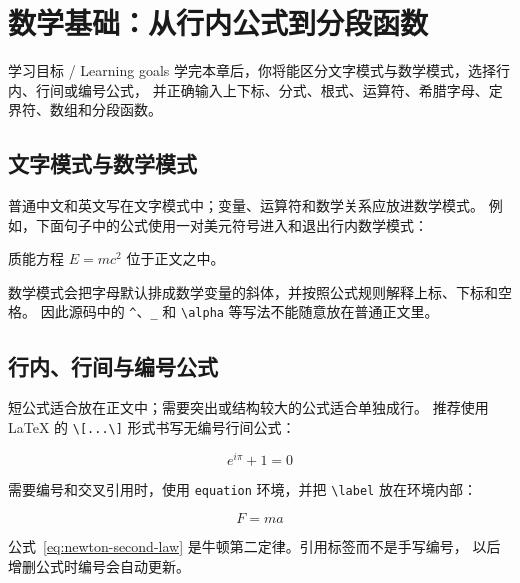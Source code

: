 %
\section{数学基础：从行内公式到分段函数}

\begin{learningbox}{学习目标 / Learning goals}
学完本章后，你将能区分文字模式与数学模式，选择行内、行间或编号公式，
并正确输入上下标、分式、根式、运算符、希腊字母、定界符、数组和分段函数。
\end{learningbox}

\subsection{文字模式与数学模式}

普通中文和英文写在文字模式中；变量、运算符和数学关系应放进数学模式。
例如，下面句子中的公式使用一对美元符号进入和退出行内数学模式：

质能方程 $E=mc^2$ 位于正文之中。

数学模式会把字母默认排成数学变量的斜体，并按照公式规则解释上标、下标和空格。
因此源码中的 \verb|^|、\verb|_| 和 \verb|\alpha| 等写法不能随意放在普通正文里。

\subsection{行内、行间与编号公式}

短公式适合放在正文中；需要突出或结构较大的公式适合单独成行。
推荐使用 LaTeX 的 \verb|\[...\]| 形式书写无编号行间公式：

\[
    e^{i\pi}+1=0
\]

需要编号和交叉引用时，使用 \texttt{equation} 环境，并把 \verb|\label|
放在环境内部：

\begin{equation}
    F=ma
    \label{eq:newton-second-law}
\end{equation}

公式~\eqref{eq:newton-second-law} 是牛顿第二定律。引用标签而不是手写编号，
以后增删公式时编号会自动更新。

